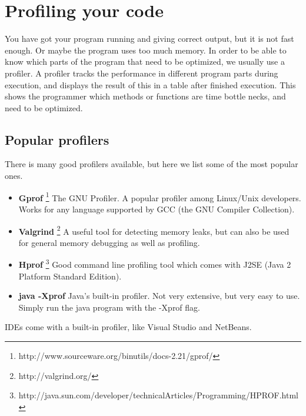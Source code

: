 \documentclass[11pt,a4paper,twoside]{article}
\begin{document}
\section{Profiling your code}

You have got your program running and giving correct output, but it is not fast
enough. Or maybe the program uses too much memory. In order to be able to know
which parts of the program that need to be optimized, we usually use a
profiler.  A profiler tracks the performance in different program parts during
execution, and displays the result of this in a table after finished execution.
This shows the programmer which methods or functions are time bottle necks, and
need to be optimized.

\subsection{Popular profilers}
There is many good profilers available, but here we list some of the most
popular ones.
\begin{itemize}
    \item \textbf{Gprof} \footnote{http://www.sourceware.org/binutils/docs-2.21/gprof/}
    The GNU Profiler. A popular profiler among Linux/Unix developers.  Works for any
    language supported by GCC (the GNU Compiler Collection).

    \item \textbf{Valgrind} \footnote{http://valgrind.org/} 
    A useful tool for detecting memory leaks, but can also be used for general
    memory debugging as well as profiling.

    \item \textbf{Hprof} \footnote{http://java.sun.com/developer/technicalArticles/Programming/HPROF.html}
    Good command line profiling tool which comes with J2SE (Java 2 Platform Standard Edition).

    \item \textbf{java -Xprof} 
    Java's built-in profiler. Not very extensive, but very easy to use. Simply
    run the java program with the -Xprof flag.

\end{itemize}

 IDEs come with a built-in profiler, like Visual Studio and NetBeans.

\end{document}
